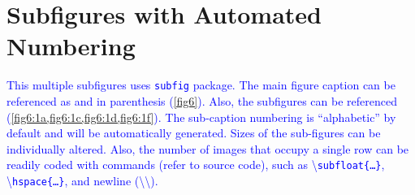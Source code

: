 \documentclass[phd,showgrids]{ndsu-thesis-2022}
\newcommand\italk[1]{\textcolor{blue}{#1}}  %
\newcommand\cmd[1]{\textbackslash\texttt{#1}}  %
\begin{document}
\kant[4]


\section{Subfigures with Automated Numbering}
 \italk{This multiple subfigures uses \texttt{subfig} package. The main figure caption can be referenced as \Cref{fig6} and in parenthesis (\cref{fig6}). Also, the subfigures can be referenced (\cref{fig6:1a,fig6:1c,fig6:1d,fig6:1f}). The sub-caption numbering is ``alphabetic'' by default and will be automatically generated. Sizes of the sub-figures can be individually altered. Also, the number of images that occupy a single row can be readily coded with commands (refer to source code), such as \cmd{subfloat\{\ldots\}}, \cmd{hspace\{\ldots\}}, and newline (\textbackslash\textbackslash).} 
 
\end{document}
